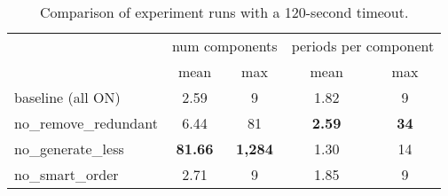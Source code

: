\begin{table}[H]
	\centering
	\begin{tabular}{l c c c c}
		\toprule
		& \multicolumn{2}{c}{num components} & \multicolumn{2}{c}{periods per component} \\
		\cmidrule(lr){2-3} \cmidrule(lr){4-5}
		& mean & max & mean & max \\
		\midrule
	baseline (all ON) & 2.59 & 9 & 1.82 & 9 \\
	no\_remove\_redundant & 6.44 & 81 & \textbf{2.59} & \textbf{34} \\
	no\_generate\_less & \textbf{81.66} & \textbf{1{,}284} & 1.30 & 14 \\
	no\_smart\_order & 2.71 & 9 & 1.85 & 9 \\
  \bottomrule
	\end{tabular}
	\caption{Comparison of experiment runs with a 120-second timeout.}
\end{table}
